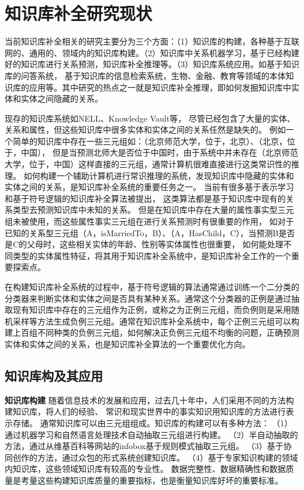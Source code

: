 

\chapter{知识库补全研究现状}
\label{cha:related-work}

当前知识库补全相关的研究主要分为三个方面：（1）知识库的构建，各种基于互联网的、通用的、领域内的知识库构建。（2）知识库中关系机器学习，基于已经构建好的知识库进行关系预测，知识库补全推理等。（3）知识库系统应用。如基于知识库的问答系统，
基于知识库的信息检索系统，生物、金融、教育等领域的本体知识库的应用等。其中研究的热点之一就是知识库补全推理，即如何发掘知识库中实体和实体之间隐藏的关系。

现存的知识库系统如NELL、Knowledge Vault等，
尽管已经包含了大量的实体、关系和属性，但这些知识库中很多实体和实体之间的关系任然是缺失的。
例如一个简单的知识库中存在一些三元组如：（北京师范大学，位于，北京）、（北京，位于，中国），
但是当预测北师大是否位于中国时，由于系统中并未存在（北京师范大学，位于，中国）这样直接的三元组，通常计算机很难直接进行这类常识性的推理。
如何构建一个辅助计算机进行常识推理的系统，发现知识库中隐藏的实体和实体之间的关系，是知识库补全系统的重要任务之一。
当前有很多基于表示学习和基于符号逻辑的知识库补全算法被提出，
这类算法都是基于知识库中现有的关系类型去预测知识库中未知的关系。
但是在知识库中存在大量的属性事实型三元组未被使用，而这些属性事实三元组在进行关系预测时有很重要的作用，
如对于已知的关系型三元组（A，isMarriedTo，B）、（A，HasChild，C），当预测B是否是C的父母时，这些相关实体的年龄、性别等实体属性也很重要，
如何能处理不同类型的实体属性特征，将其用于知识库补全系统中，是知识库补全工作的一个重要探索点。

在构建知识库补全系统的过程中，基于符号逻辑的算法通常通过训练一个二分类的分类器来判断实体和实体之间是否具有某种关系。通常这个分类器的正例是通过抽取现有知识库中存在的三元组作为正例，或称之为正例三元组，而负例则是采用随机采样等方法生成负例三元组。通常在知识库补全系统中，每个正例三元组可以构建上百组不同种类的负例三元组，如何解决正负例三元组不均衡的问题，正确预测实体和实体之间的关系，也是知识库补全算法的一个重要优化方向。

\section{知识库构及其应用}

\textbf{知识库构建} 随着信息技术的发展和应用，过去几十年中，人们采用不同的方法构建知识库，将人们的经验、
常识和现实世界中的事实知识用知识库的方法进行表示存储。
通常知识库可以由三元组组成。知识库的构建可以有多种方法：
（1）通过机器学习和自然语言处理技术自动抽取三元组\cite{Weikum2010FromIT}进行构建。
（2）半自动抽取的方法，通过从维基百科等网站的infobox基于规则模式抽取三元组。
（3）基于协同创作\cite{Vrandecic2014WikidataAF}的方法，通过众包的形式系统创建知识库。
（4）基于专家知识构建的领域内知识库，这些领域知识库有较高的专业性。
数据完整性、数据精确性和数据质量是考量这些构建知识库质量的重要指标，也是衡量知识库好坏的重要标准。



